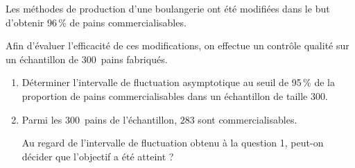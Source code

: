 
Les méthodes de production d'une boulangerie ont été modifiées dans le but d'obtenir 96\,\% de pains commercialisables. 

Afin d'évaluer l'efficacité de ces modifications, on effectue un contrôle qualité sur un échantillon de 300~pains fabriqués.

\medskip
 
\begin{enumerate}
\item Déterminer l'intervalle de fluctuation asymptotique au seuil de 95\,\% de la proportion de pains commercialisables dans un échantillon de taille $300$. 
\item Parmi les $300$~pains de l'échantillon, $283$ sont commercialisables. 

Au regard de l'intervalle de fluctuation  obtenu à la question 1, peut-on décider que l'objectif a été atteint ? 
\end{enumerate}